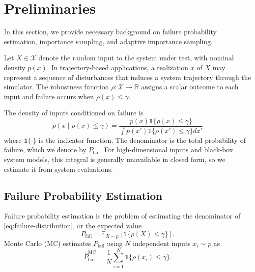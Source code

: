 \documentclass[twoside,11pt]{article}
\begin{document}
\section{Preliminaries}
\label{sec:background}

In this section, we provide necessary background on failure probability estimation, importance sampling, and adaptive importance sampling.

Let $X \in \mathcal{X}$ denote the random input to the system under test, with nominal density $p(x)$. In trajectory-based applications, a realization $x$ of $X$ may represent a sequence of disturbances that induces a system trajectory through the simulator. The robustness function $\rho:\mathcal{X}\to\mathbb{R}$ assigns a scalar outcome to each input and failure occurs when $\rho(x)\leq\gamma$.

The density of inputs conditioned on failure is
\begin{equation}
    \label{eq:failure-distribution}
    p(x \mid \rho(x) \leq \gamma)
    =
    \frac{
        p(x) \mathds{1}\{\rho(x) \leq \gamma\}
    }{
        \int p(x') \mathds{1}\{\rho(x') \leq \gamma\} dx'
    }
\end{equation}
where $\mathds{1}\{\cdot\}$ is the indicator function. The denominator is the total probability of failure, which we denote by $P_{\text{fail}}$. For high-dimensional inputs and black-box system models, this integral is generally unavailable in closed form, so we estimate it from system evaluations.

\subsection{Failure Probability Estimation}

Failure probability estimation is the problem of estimating the denominator of \cref{eq:failure-distribution}, or the expected value
\begin{equation*}
    P_{\text{fail}}
=
\mathbb{E}_{X\sim p}
\left[
    \mathds{1}\{\rho(X)\leq\gamma\}
\right].
\end{equation*}
Monte Carlo (MC) estimates $P_{\text{fail}}$ using $N$ independent inputs $x_i \sim p$ as
\begin{equation*}
    \hat{P}^{\text{MC}}_{\text{fail}}
    =
    \frac{1}{N}
    \sum_{i=1}^N
    \mathds{1}\{\rho(x_i)\leq\gamma\}.
\end{equation*}
\end{document}
